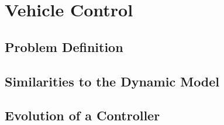 \chapter{Vehicle Control}

\section{Problem Definition}

\section{Similarities to the Dynamic Model}

\section{Evolution of a Controller}
